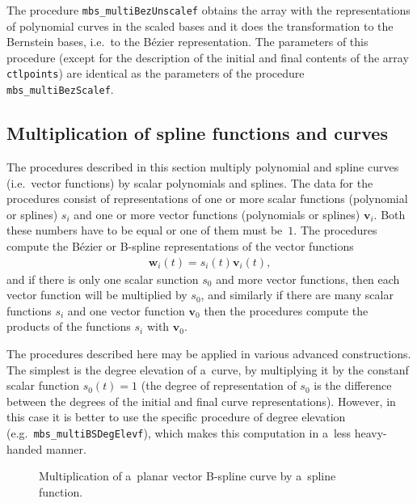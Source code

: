 \vspace{\bigskipamount}
\begin{sloppypar}
The procedure \texttt{mbs\_multiBezUnscalef} obtains the array
with the representations of polynomial curves in the scaled bases
and it does the transformation to the Bernstein bases, i.e.\ to the
B\'{e}zier representation. The parameters of this procedure
(except for the description of the initial and final contents of
the array \texttt{ctlpoints}) are identical as the parameters of the
procedure \texttt{mbs\_multiBezScalef}.
\end{sloppypar}


\subsection{Multiplication of spline functions and curves}

The procedures described in this section multiply polynomial and spline
curves (i.e.\ vector functions) by scalar polynomials and splines.
The data for the procedures consist of representations of one or more
scalar functions (polynomial or splines) $s_i$ and one or more vector
functions (polynomials or splines) $\bm{v}_i$. Both these numbers have to
be equal or one of them must be~$1$. The procedures compute the B\'{e}zier
or B-spline representations of the vector functions
\begin{align*}
  \bm{w}_i(t) = s_i(t)\bm{v}_i(t),
\end{align*}
and if there is only one scalar sunction $s_0$ and more vector functions,
then each vector function will be multiplied by $s_0$, and similarly
if there are many scalar functions $s_i$ and one vector function $\bm{v}_0$
then the procedures compute the products of the functions $s_i$ with $\bm{v}_0$.

The procedures described here may be applied in various advanced constructions.
The simplest is the degree elevation of a~curve, by multiplying it by
the constanf scalar function $s_0(t)=1$ (the degree of representation of $s_0$
is the difference between the degrees of the initial and final curve
representations). However, in this case it is better to use the specific
procedure of degree elevation (e.g.\ \texttt{mbs\_multiBSDegElevf}), which
makes this computation in a~less heavy-handed manner.%
\begin{figure}[ht]
  \centerline{}
  \caption{Multiplication of a~planar vector B-spline curve by a~spline function.}
\end{figure}

